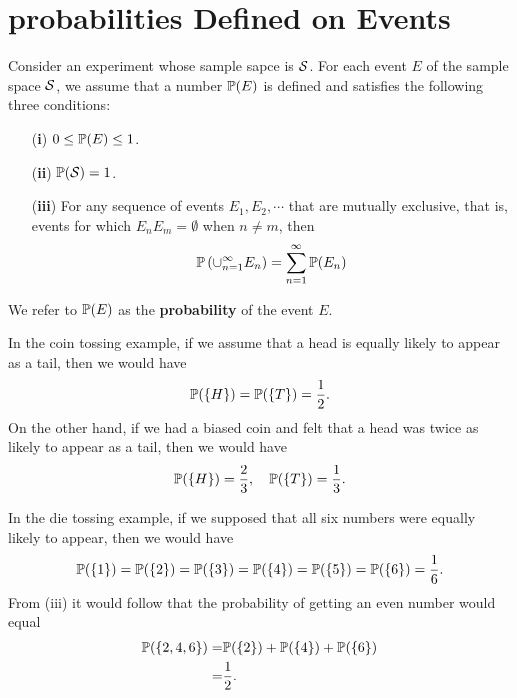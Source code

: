 \section{probabilities Defined on Events}

\begin{definition}
    Consider an experiment whose sample sapce is $\mathcal{S}$. For each event $E$ of the sample space $\mathcal{S}$, we assume that a number $\mathbb{P} (E)$ is defined and satisfies the following three conditions:
    \begin{enumerate}
        \item[(\textbf{i})] $0 \le \mathbb{P} (E) \le 1$. 
        \item[(\textbf{ii})] $\mathbb{P} (\mathcal{S}) = 1$.
        \item[(\textbf{iii})] For any sequence of events $E_1, E_2, \cdots$ that are mutually exclusive, that is, events for which $E_n E_m = \emptyset$ when $n \neq m$, then 
        \begin{equation*}
            \mathbb{P} \left( \cup_{n = 1}^\infty E_n \right) = \sum_{n = 1}^\infty \mathbb{P} (E_n)
        \end{equation*}  
    \end{enumerate}
    We refer to $\mathbb{P} (E)$ as the \textbf{probability} of the event $E$.
\end{definition}

\begin{example}
    In the coin tossing example, if we assume that a head is equally likely to appear as a tail, then we would have 
    \begin{equation*}
        \mathbb{P} (\{H\}) = \mathbb{P} (\{T\}) = \frac{1}{2}.
    \end{equation*}
    On the other hand, if we had a biased coin and felt that a head was twice as likely to appear as a tail, then we would have 
    \begin{equation*}
        \mathbb{P} (\{H\}) = \frac{2}{3}, \quad \mathbb{P} (\{T\}) = \frac{1}{3}.
    \end{equation*}
\end{example}

\begin{example}
    In the die tossing example, if we supposed that all six numbers were equally likely to appear, then we would have
    \begin{equation*}
        \mathbb{P} (\{1\}) = \mathbb{P} (\{2\}) = \mathbb{P} (\{3\}) = \mathbb{P} (\{4\}) = \mathbb{P} (\{5\}) = \mathbb{P} (\{6\}) = \frac{1}{6}. 
    \end{equation*}
    From (iii) it would follow that the probability of getting an even number would equal 
    \begin{align*}
        \mathbb{P} (\{2, 4, 6\}) = & \mathbb{P}(\{2\}) + \mathbb{P}(\{4\}) + \mathbb{P}(\{6\}) \\ 
        = & \frac{1}{2}.
    \end{align*}
\end{example}

